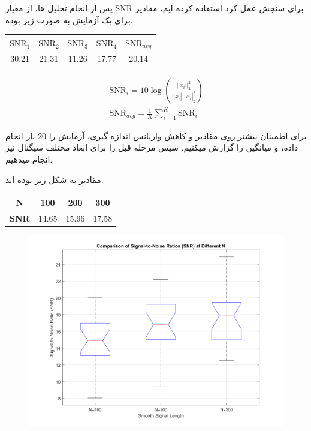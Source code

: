 پس از انجام تحلیل ها، از معیار SNR برای سنجش عمل کرد استفاده کرده ایم، مقادیر برای یک آزمایش به صورت زیر بوده.


\begin{minipage}{0.6\linewidth}
	\vspace*{1em}
	\centering
	\begin{latin}
		\begin{tabular}{c|c|c|c|c}
			\textbf{$\text{SNR}_1$} & \textbf{$\text{SNR}_2$} & \textbf{$\text{SNR}_3$} & \textbf{$\text{SNR}_4$} & \textbf{$\text{SNR}_{avg}$} \\
			\hline
			30.21                   & 21.31                   & 11.26                   & 17.77                   & 20.14
		\end{tabular}
	\end{latin}
\end{minipage}
\begin{minipage}{0.4\linewidth}
	\begin{gather*}
		\text{SNR}_i = 10\log\left(\frac{||x_i||^2_2}{||x_i|-\tilde{x}_i|^2_2}\right)\\
		\text{SNR}_{avg} = \frac{1}{K}\sum_{i=1}^{K}\text{SNR}_i
	\end{gather*}
\end{minipage}
\vspace*{1em}

برای اطمینان بیشتر روی مقادیر و کاهش واریانس اندازه گیری، آزمایش را 20 بار انجام داده، و میانگین را گزارش میکنیم. سپس مرحله قبل را برای ابعاد مختلف سیگنال نیز انجام میدهیم.

مقادیر به شکل زیر بوده اند.

\vfil

\begin{latin}
	\centering
	\begin{tabular}{c|c|c|c}
		\textbf{N}   & 100   & 200   & 300   \\
		\hline
		\textbf{SNR} & 14.65 & 15.96 & 17.58 \\
	\end{tabular}
\end{latin}

\clearpage

\begin{figure}[h!]
	\centering
	\includegraphics*[width=0.8\linewidth]{../results/SNR_Part6.png}
\end{figure}


